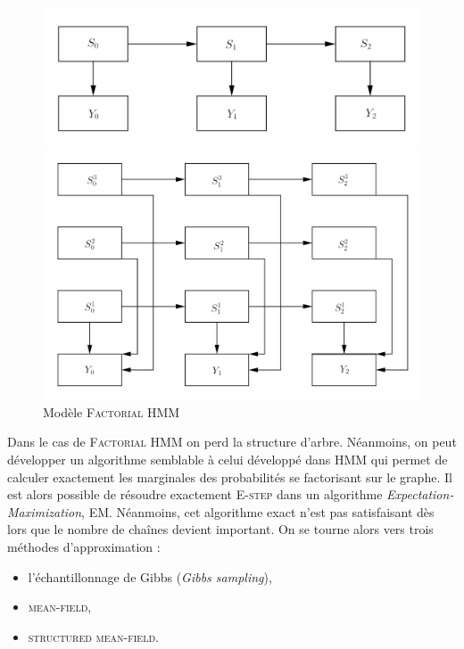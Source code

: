 \documentclass[10pt,a4paper]{article}
\newcommand{\hmm}{\textsc{HMM}}
\newcommand{\fhmm}{\textsc{Factorial HMM}}
\newcommand{\Estep}{\textsc{E-step}}
\newcommand{\EM}{\textsc{EM}}
\newcommand{\meanfield}{\textsc{mean-field}}
\newcommand{\structmeanfield}{\textsc{structured mean-field}}
\begin{document}
\begin{figure}[H]
  \centering
  \begin{minipage}{.46\linewidth}
    \centering
      \includegraphics[scale=0.1]{../resources/pictures/graph1.png}
      \caption{Modèle \hmm}
  \end{minipage}
  \begin{minipage}{.46\linewidth}
    \centering
      \includegraphics[scale=0.1]{../resources/pictures/graph2.png}
      \caption{Modèle \fhmm}
  \end{minipage}
\end{figure}

Dans le cas de \fhmm{} on perd la structure d'arbre.
Néanmoins, on peut développer un algorithme semblable à celui développé dans 
\hmm{} qui permet de calculer exactement les marginales des probabilités se 
factorisant sur le graphe.
Il est alors possible de résoudre exactement \Estep{} dans un algorithme 
\emph{Expectation-Maximization}, \EM. Néanmoins, cet algorithme exact n'est pas 
satisfaisant dès lors que le nombre de chaînes devient important.
On se tourne alors vers trois méthodes d'approximation :
\begin{itemize}
  \item l'échantillonnage de Gibbs (\emph{Gibbs sampling}),
  \item \meanfield{},
  \item \structmeanfield.
\end{itemize}
\end{document}
